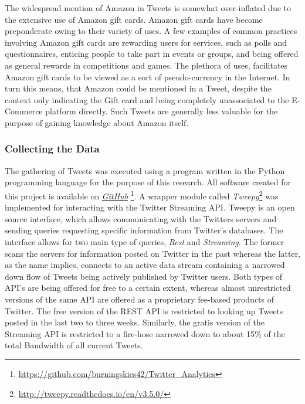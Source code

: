 			\par
			
			The widespread mention of Amazon in Tweets is somewhat over-inflated due to the extensive use of Amazon gift cards. Amazon gift cards have become preponderate owing to their variety of uses. A few examples of common practices involving Amazon gift cards are rewarding users for services, such as polls and questionnaires, enticing people to take part in events or groups, and being offered as general rewards in competitions and games. The plethora of uses, facilitates Amazon gift cards to be viewed as a sort of pseudo-currency in the Internet. In turn this means, that Amazon could be mentioned in a Tweet, despite the context only indicating the Gift card and being completely unassociated to the E-Commerce platform directly. Such Tweets are generally less valuable for the purpose of gaining knowledge about Amazon itself.
		
		\subsubsection*{Collecting the Data}
		\label{sec:collect_data}
			The gathering of Tweets was executed using a program written in the Python programming language for the purpose of this research. All software created for this project is available on \href{https://github.com/burningskies42/Twitter_Analytics}{\textit{GitHub}} \footnote{\url{https://github.com/burningskies42/Twitter_Analytics}}. A wrapper module called \textit{Tweepy}\footnote{\url{http://tweepy.readthedocs.io/en/v3.5.0/}} was implemented for interacting with the Twitter Streaming API. Tweepy is an open source interface, which allows communicating with the Twitters servers and sending queries requesting specific information from Twitter's databases. The interface allows for two main type of queries, \textit{Rest} and \textit{Streaming}. The former scans the servers for information posted on Twitter in the past whereas the latter, as the name implies, connects to an active data stream containing a narrowed down flow of Tweets being actively published by Twitter users. Both types of API's are being offered for free to a certain extent, whereas almost unrestricted versions of the same API are offered as a proprietary fee-based products of Twitter. The free version of the REST API is restricted to looking up Tweets posted in the last two to three weeks. Similarly, the gratis version of the Streaming API is restricted to a fire-hose narrowed down to about 15\% of the total Bandwidth of all current Tweets.
			
